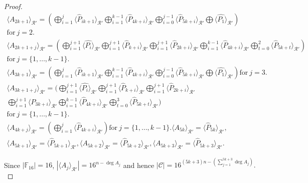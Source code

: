 \documentclass{amsart}
\theoremstyle{definition}
\theoremstyle{remark}
\numberwithin{equation}{section}
\begin{document}
\begin{proof}
\begin{gather*}
        \langle  A_{2k+1} \rangle_{\mathcal{R}'} =   \left( \bigoplus_{i=1}^{j} \langle \hat{P}_{ik+1} \rangle_{\mathcal{R}'} \bigoplus_{i=1}^{k-1} \langle \hat{P}_{4k+i} \rangle_{\mathcal{R}'} \bigoplus_{i=0}^{j-1} \langle \hat{P}_{5k+i} \rangle_{\mathcal{R}'} \bigoplus \langle \hat{P_{1}} \rangle_{\mathcal{R}'}  \right) \\ \text{for}~ j =2. \\
        \langle  A_{2k+1+j} \rangle_{\mathcal{R}'} = \left( \bigoplus_{i=1}^{j+1} \langle \hat{P_{i}} \rangle_{\mathcal{R}'} \bigoplus_{i=1}^{j+1} \langle \hat{P}_{k+i} \rangle_{\mathcal{R}'}  \bigoplus_{i=1}^{j+1} \langle \hat{P}_{2k+i} \rangle_{\mathcal{R}'} \bigoplus_{i=1}^{k-1} \langle \hat{P}_{4k+i} \rangle_{\mathcal{R}'} \bigoplus_{t=0}^{2} \langle \hat{P}_{5k+t} \rangle_{\mathcal{R}'}   \right) \\ \text{for} ~ j = \{1,\dots,k-1\}. \\
        \langle  A_{3k+1} \rangle_{\mathcal{R}'} =  \left( \bigoplus_{i=1}^{j} \langle \hat{P}_{ik+1} \rangle_{\mathcal{R}'} \bigoplus_{i=1}^{k-1} \langle \hat{P}_{4k+i} \rangle_{\mathcal{R}'} \bigoplus_{i=0}^{j-1} \langle \hat{P}_{5k+i} \rangle_{\mathcal{R}'} \bigoplus \langle \hat{P_{1}} \rangle_{\mathcal{R}'}  \right) \text{for}~ j =3. \\
        \langle  A_{3k+1+j} \rangle_{\mathcal{R}'} = ( \bigoplus_{i=1}^{j+1} \langle \hat{P_{i}} \rangle_{\mathcal{R}'} \bigoplus_{i=1}^{j+1} \langle \hat{P}_{k+i} \rangle_{\mathcal{R}'}  \bigoplus_{i=1}^{j+1} \langle \hat{P}_{2k+i} \rangle_{\mathcal{R}'} \\ \bigoplus_{i=1}^{j+1} \langle \hat{P}_{3k+i} \rangle_{\mathcal{R}'} \bigoplus_{i=1}^{k-1} \langle \hat{P}_{4k+i} \rangle_{\mathcal{R}'} \bigoplus_{t=0}^{3} \langle \hat{P}_{5k+t} \rangle_{\mathcal{R}'}   ) \\ \text{for} ~ j = \{1,\dots,k-1\}. \\
        \langle  A_{4k+j} \rangle_{\mathcal{R}'} = \left( \bigoplus_{i=1}^{j} \langle \hat{P}_{4k+i} \rangle_{\mathcal{R}'} \right) \text{for} ~ j = \{1,\dots,k-1\}.\langle  A_{5k} \rangle_{\mathcal{R}'} = \langle \hat{P}_{5k} \rangle_{\mathcal{R}'}, \\  \langle  A_{5k+1} \rangle_{\mathcal{R}'}= \langle \hat{P}_{5k+1} \rangle_{\mathcal{R}'} ,\langle  A_{5k+2} \rangle_{\mathcal{R}'} = \langle \hat{P}_{5k+2} \rangle_{\mathcal{R}'} ,\langle  A_{5k+3} \rangle_{\mathcal{R}'} =  \langle \hat{P}_{5k+3} \rangle_{\mathcal{R}'}.
    \end{gather*}

Since $|\mathbb F_{16}|=16$, $|\langle A_j \rangle_{\mathcal{R}'}|={16}^{n-\deg A_j}$ and hence
$|\mathcal{C}|=16^{(5k+3)n-( \sum_{j=1}^{5k+3}\deg A_j)}.$

\end{proof}
\end{document}
